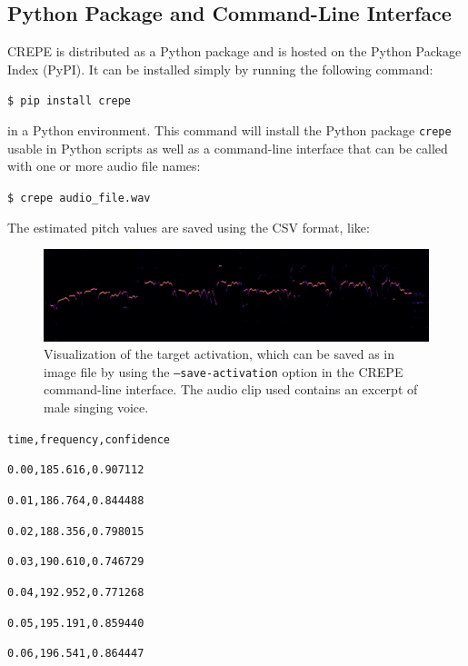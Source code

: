 \subsection{Python Package and Command-Line Interface}

CREPE is distributed as a Python package and is hosted on the Python Package Index (PyPI). It can be installed simply by running the following command:

\vspace{1em}
\texttt{\$ pip install crepe}
\vspace{1em}

\noindent in a Python environment. This command will install the Python package \texttt{crepe} usable in Python scripts as well as a command-line interface that can be called with one or more audio file names:

\vspace{1em}
\texttt{\$ crepe audio\_file.wav}
\vspace{1em}

\noindent The estimated pitch values are saved using the CSV format, like:

\begin{figure}[b]
	\includegraphics[width=\linewidth]{activation.png}
	\caption{Visualization of the target activation, which can be saved as in image file by using the \texttt{--save-activation} option in the CREPE command-line interface. The audio clip used contains an excerpt of male singing voice.}\label{fig:crepe-activation}
\end{figure}

\vspace{1em}
\texttt{time,frequency,confidence}

\texttt{0.00,185.616,0.907112}

\texttt{0.01,186.764,0.844488}

\texttt{0.02,188.356,0.798015}

\texttt{0.03,190.610,0.746729}

\texttt{0.04,192.952,0.771268}

\texttt{0.05,195.191,0.859440}

\texttt{0.06,196.541,0.864447}

